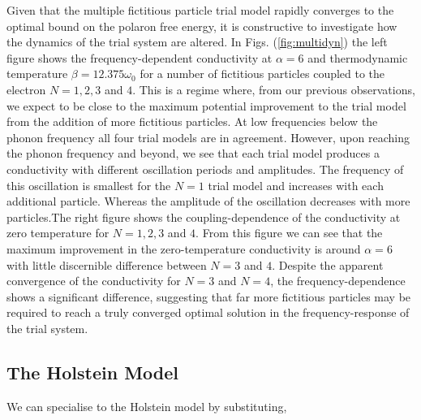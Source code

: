 Given that the multiple fictitious particle trial model rapidly converges to the optimal bound on the polaron free energy, it is constructive to investigate how the dynamics of the trial system are altered. In Figs. (\ref{fig:multidyn}) the left figure shows the frequency-dependent conductivity at $\alpha = 6$ and thermodynamic temperature $\beta = 12.375 \omega_0$ for a number of fictitious particles coupled to the electron $N = 1, 2, 3$ and $4$. This is a regime where, from our previous observations, we expect to be close to the maximum potential improvement to the trial model from the addition of more fictitious particles. At low frequencies below the phonon frequency all four trial models are in agreement. However, upon reaching the phonon frequency and beyond, we see that each trial model produces a conductivity with different oscillation periods and amplitudes. The frequency of this oscillation is smallest for the $N=1$ trial model and increases with each additional particle. Whereas the amplitude of the oscillation decreases with more particles.The right figure shows the coupling-dependence of the conductivity at zero temperature for $N=1, 2,3$ and $4$. From this figure we can see that the maximum improvement in the zero-temperature conductivity is around $\alpha = 6$ with little discernible difference between $N=3$ and $4$. Despite the apparent convergence of the conductivity for $N=3$ and $N=4$, the frequency-dependence shows a significant difference, suggesting that far more fictitious particles may be required to reach a truly converged optimal solution in the frequency-response of the trial system.

\subsection{The Holstein Model}

We can specialise to the Holstein model by substituting,

